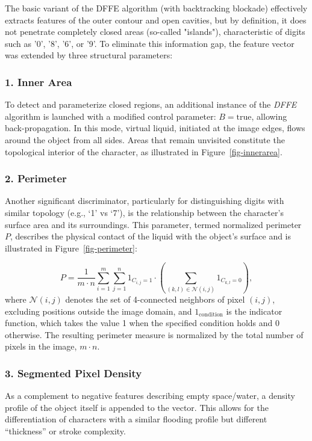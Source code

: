 \documentclass[a4paper,fleqn]{cas-dc}
\begin{document}
The basic variant of the DFFE algorithm (with backtracking blockade) effectively extracts features of the outer contour and open cavities, but by definition, it does not penetrate completely closed areas (so-called "islands"), characteristic of digits such as '0', '8', '6', or '9'. To eliminate this information gap, the feature vector was extended by three structural parameters:

\subsubsection*{1. Inner Area}
 To detect and parameterize closed regions, an additional instance of the 
 \textit{DFFE} algorithm is launched with a modified control parameter: 
 $B = \text{true}$, allowing back-propagation. In this mode, virtual liquid, 
 initiated at the image edges, flows around the object from all sides. Areas 
 that remain unvisited constitute the topological interior of the character, 
 as illustrated in Figure~\ref{fig-innerarea}.

\subsubsection*{2. Perimeter}
Another significant discriminator, particularly for distinguishing digits with 
similar topology (e.g., `1' vs `7'), is the relationship between the 
character's surface area and its surroundings. This parameter, termed 
normalized perimeter $P$, describes the physical contact of the liquid with 
the object's surface and is illustrated in Figure~\ref{fig-perimeter}:

\begin{equation}
    P = \frac{1}{m \cdot n} \sum_{i=1}^{m} \sum_{j=1}^{n} 1_{C_{i,j}=1} \cdot 
    \left( \sum_{(k,l) \in \mathcal{N}(i,j)} 1_{C_{k,l}=0} \right),
\end{equation}
where $\mathcal{N}(i,j)$ denotes the set of 4-connected neighbors of pixel 
$(i,j)$, excluding positions outside the image domain, and $1_{\text{condition}}$ 
is the indicator function, which takes the value 1 when the specified condition 
holds and 0 otherwise. The resulting perimeter measure is normalized by the 
total number of pixels in the image, $m \cdot n$.

\subsubsection*{3. Segmented Pixel Density}
As a complement to negative features describing empty space/water, a density 
profile of the object itself is appended to the vector. This allows for the 
differentiation of characters with a similar flooding profile but different 
``thickness'' or stroke complexity.
\end{document}
